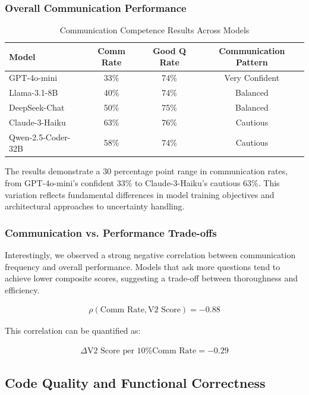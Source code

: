 \documentclass[conference]{IEEEtran}
\begin{document}
\subsubsection{Overall Communication Performance}

\begin{table}[ht]
\centering
\small
\caption{Communication Competence Results Across Models}
\begin{tabular}{lccc}
\toprule
\textbf{Model} & \textbf{Comm Rate} & \textbf{Good Q Rate} & \textbf{Communication Pattern} \\
\midrule
GPT-4o-mini & 33\% & 74\% & Very Confident \\
Llama-3.1-8B & 40\% & 74\% & Balanced \\
DeepSeek-Chat & 50\% & 75\% & Balanced \\
Claude-3-Haiku & 63\% & 76\% & Cautious \\
Qwen-2.5-Coder-32B & 58\% & 74\% & Cautious \\
\bottomrule
\end{tabular}
\label{tab:communication_results}
\end{table}

The results demonstrate a 30 percentage point range in communication rates, from GPT-4o-mini's confident 33\% to Claude-3-Haiku's cautious 63\%. This variation reflects fundamental differences in model training objectives and architectural approaches to uncertainty handling.

\subsubsection{Communication vs. Performance Trade-offs}

Interestingly, we observed a strong negative correlation between communication frequency and overall performance. Models that ask more questions tend to achieve lower composite scores, suggesting a trade-off between thoroughness and efficiency.

\begin{align}
\rho(\text{Comm Rate}, \text{V2 Score}) = -0.88
\end{align}

This correlation can be quantified as:

\begin{align}
\Delta \text{V2 Score per 10\% Comm Rate} = -0.29
\end{align}

\subsection{Code Quality and Functional Correctness}
\end{document}
